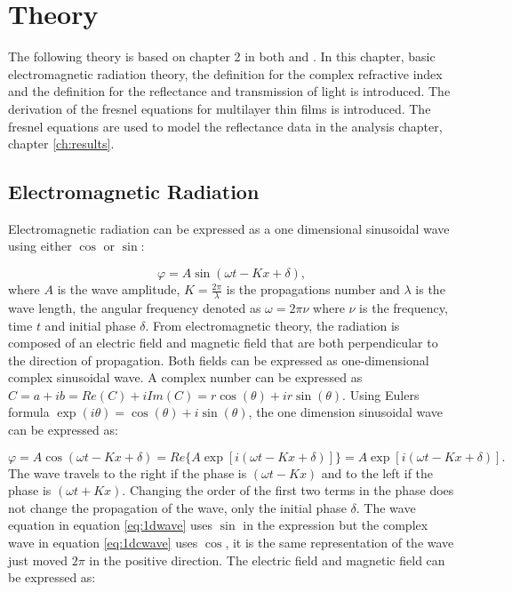 \documentclass[MasterThesisMain.tex]{subfiles}
\begin{document}
\chapter{Theory}\label{lighttheory}

The following theory is based on chapter 2 in both \cite{fujiwara2007spectroscopic} and \cite{tompkins2015spectroscopic}. In this chapter, basic electromagnetic radiation theory, the definition for the complex refractive index and the definition for the reflectance and transmission of light is introduced. The derivation of the fresnel equations for multilayer thin films is introduced. The fresnel equations are used to model the reflectance data in the analysis chapter, chapter \ref{ch:results}.

\section{Electromagnetic Radiation}
Electromagnetic radiation can be expressed as a one dimensional sinusoidal wave using either $\cos$ or $\sin$:

\begin{equation}\label{eq:1dwave}
\varphi = A\sin(\omega t - Kx +\delta),
\end{equation}
where $A$ is the wave amplitude, $K=\frac{2\pi}{\lambda}$ is the propagations number and $\lambda$ is the wave length, the angular frequency denoted as $\omega = 2\pi\nu$ where $\nu$ is the frequency, time $t$ and initial phase $\delta$.
From electromagnetic theory, the radiation is composed of an electric field and magnetic field that are both perpendicular to the direction of propagation. Both fields can be expressed as one-dimensional complex sinusoidal wave. A complex number can be expressed as $C= a + ib =Re(C) + i Im(C) =r\cos(\theta)+ir\sin(\theta)$. Using Eulers formula $\exp(i\theta)=\cos(\theta)+i\sin(\theta)$, the one dimension sinusoidal wave can be expressed as:

\begin{equation}\label{eq:1dcwave}
\varphi=A\cos(\omega t- Kx +\delta) = Re \{A\exp[i(\omega t- Kx +\delta)]\} = A\exp[i(\omega t - Kx + \delta)]. 
\end{equation}
The wave travels to the right if the phase is $(\omega t - Kx)$ and to the left if the phase is $(\omega t + Kx)$. Changing the order of the first two terms in the phase does not change the propagation of the wave, only the initial phase $\delta$. The wave equation in equation \ref{eq:1dwave} uses $\sin$ in the expression but the complex wave in equation \ref{eq:1dcwave} uses $\cos$, it is the same representation of the wave just moved $2\pi$ in the positive direction. The electric field and magnetic field can be expressed as:
\end{document}
